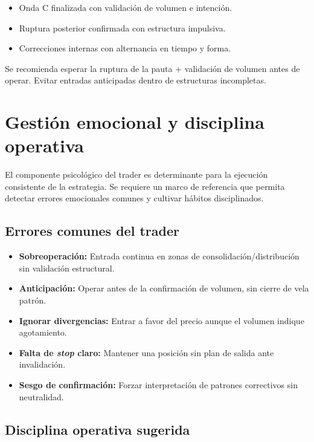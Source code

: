 \begin{itemize}
    \item Onda C finalizada con validaci\'on de volumen e intenci\'on.
    \item Ruptura posterior confirmada con estructura impulsiva.
    \item Correcciones internas con alternancia en tiempo y forma.
\end{itemize}

Se recomienda esperar la ruptura de la pauta + validaci\'on de volumen antes de operar. Evitar entradas anticipadas dentro de estructuras incompletas.

\vspace{2em}

\section{Gesti\'on emocional y disciplina operativa}

El componente psicol\'ogico del trader es determinante para la ejecuci\'on consistente de la estrategia. Se requiere un marco de referencia que permita detectar errores emocionales comunes y cultivar h\'abitos disciplinados.

\subsection*{Errores comunes del trader}

\begin{itemize}
    \sloppy
    \raggedright
    \item \textbf{Sobreoperaci\'on:} Entrada continua en zonas de consolidaci\'on/distribuci\'on sin validaci\'on estructural.   
    \item \textbf{Anticipaci\'on:} Operar antes de la confirmaci\'on de volumen, sin cierre de vela patr\'on.
    \item \textbf{Ignorar divergencias:} Entrar a favor del precio aunque el volumen indique agotamiento.
    \item \textbf{Falta de \textit{stop} claro:} Mantener una posici\'on sin plan de salida ante invalidaci\'on.
    \item \textbf{Sesgo de confirmaci\'on:} Forzar interpretaci\'on de patrones correctivos sin neutralidad.
\end{itemize}

\subsection*{Disciplina operativa sugerida}

